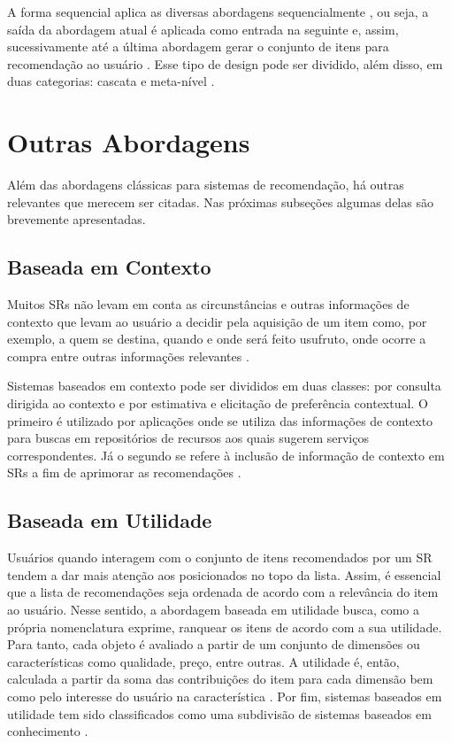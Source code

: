     A forma sequencial aplica as diversas abordagens sequencialmente \cite{Jannach2010}, ou seja, a saída da abordagem atual é aplicada como entrada na seguinte e, assim, sucessivamente até a última abordagem gerar o conjunto de itens para recomendação ao usuário \cite{Burke2002}. Esse tipo de design pode ser dividido, além disso, em duas categorias: cascata e meta-nível \cite{Jannach2010}.
    

\section{Outras Abordagens}
    
    Além das abordagens clássicas para sistemas de recomendação, há outras relevantes que merecem ser citadas. Nas próximas subseções algumas delas são brevemente apresentadas.
    
    \subsection{Baseada em Contexto}
    
    Muitos SRs não levam em conta as circunstâncias e outras informações de contexto que levam ao usuário a decidir pela aquisição de um item como, por exemplo, a quem se destina, quando e onde será feito usufruto, onde ocorre a compra entre outras informações relevantes \cite{Ricci2010, Panniello2012}.
    
    Sistemas baseados em contexto pode ser divididos em duas classes: por consulta dirigida ao contexto e por estimativa e elicitação de preferência contextual. O primeiro é utilizado por aplicações onde se utiliza das informações de contexto para buscas em repositórios de recursos aos quais sugerem serviços correspondentes. Já o segundo se refere à inclusão de informação de contexto em SRs a fim de aprimorar as recomendações \cite{Panniello2012}.
    
    \subsection{Baseada em Utilidade}
    
    Usuários quando interagem com o conjunto de itens recomendados por um SR tendem a dar mais atenção aos posicionados no topo da lista. Assim, é essencial que a lista de recomendações seja ordenada de acordo com a relevância do item ao usuário. Nesse sentido, a abordagem baseada em utilidade busca, como a própria nomenclatura exprime, ranquear os itens de acordo com a sua utilidade. Para tanto, cada objeto é avaliado a partir de um conjunto de dimensões ou características como qualidade, preço, entre outras. A utilidade é, então, calculada a partir da soma das contribuições do item para cada dimensão bem como pelo interesse do usuário na característica \cite{Jannach2010}. Por fim, sistemas baseados em utilidade tem sido classificados como uma subdivisão de sistemas baseados em conhecimento \cite{Aggarwal2016}.
    
